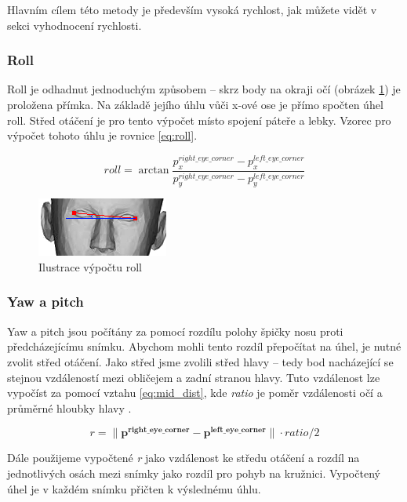 \documentclass[12pt,a4paper,titlepage,final]{report}
\begin{document}
Hlavním cílem této metody je především vysoká rychlost, jak můžete vidět v sekci vyhodnocení rychlosti.

\subsubsection{Roll}
Roll je odhadnut jednoduchým způsobem -- skrz body na okraji očí (obrázek \ref{fig:roll}) je proložena přímka. Na základě jejího úhlu vůči x-ové ose je přímo spočten úhel roll. Střed otáčení je pro tento výpočet místo spojení páteře a lebky. Vzorec pro výpočet tohoto úhlu je rovnice \ref{eq:roll}.

\begin{equation}\label{eq:roll}
roll=\arctan{\frac{p_x^{right\_eye\_corner} - p_x^{left\_eye\_corner}}{p_y^{right\_eye\_corner} - p_y^{left\_eye\_corner}}}
\end{equation}

\begin{figure}[H]
    \centering
    \includegraphics[scale=1.5]{images/roll.jpg}
    \caption{Ilustrace výpočtu roll}
    \label{fig:roll}
\end{figure}

\subsubsection{Yaw a pitch}
Yaw a pitch jsou počítány za pomocí rozdílu polohy špičky nosu proti předcházejícímu snímku. Abychom mohli tento rozdíl přepočítat na úhel, je nutné zvolit střed otáčení. Jako střed jsme zvolili střed hlavy -- tedy bod nacházející se stejnou vzdáleností mezi obličejem a zadní stranou hlavy. Tuto vzdálenost lze vypočíst za pomocí vztahu \ref{eq:mid_dist}, kde \textit{ratio} je poměr vzdálenosti očí a průměrné hloubky hlavy \cite[str.~73]{antro_points}.

\begin{equation}\label{eq:mid_dist}
r=\lVert \mathbf{p^{right\_eye\_corner} - p^{left\_eye\_corner}} \rVert \cdot ratio / 2
\end{equation}

Dále použijeme vypočtené \textit{r} jako vzdálenost ke středu otáčení a rozdíl na jednotlivých osách mezi snímky jako rozdíl pro pohyb na kružnici. Vypočtený úhel je v každém snímku přičten k výslednému úhlu. 
\end{document}
